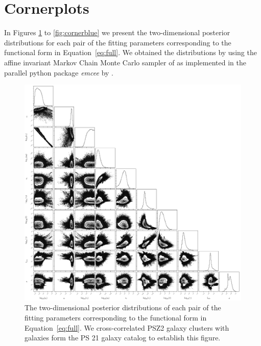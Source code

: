 \documentclass[iop, apjl, twocolappendix, numberedappendix]{emulateapj}
\begin{document}
\section{Cornerplots}
\label{sec:cornerplots}
In Figures \ref{fig:corner_21} to \ref{fig:cornerblue} we present
the two-dimensional posterior distributions for each pair of the
fitting parameters corresponding to the functional
form in Equation~\ref{eq:full}. We obtained the distributions by  using the
affine invariant Markov Chain Monte Carlo sampler of
\citet{goodman2010ensemble} as implemented in the parallel python
package {\it emcee} by \citet{foreman2013emcee}.
\begin{figure}
    \includegraphics[width= \textwidth]{corner21.pdf}
\caption{The two-dimensional posterior distributions of each pair of
the fitting parameters corresponding to the functional
form in Equation~\ref{eq:full}. We cross-correlated PSZ2 galaxy clusters with
galaxies form the PS 21 galaxy catalog to establish this figure.}
   \label{fig:corner_21} 
\end{figure}
\end{document}
